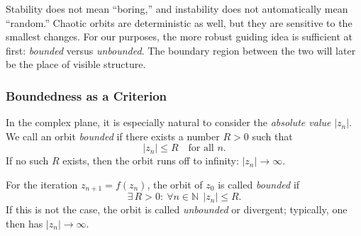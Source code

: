 \begin{figure}[h]
	\centering
	
	\hfill
\end{figure}

\begin{DidacticBox}
	\label{box:stable}
	Stability does not mean ``boring,''
	and instability does not automatically mean ``random.''
	Chaotic orbits are deterministic as well,
	but they are sensitive to the smallest changes.
	For our purposes, the more robust guiding idea is sufficient at first:
	\emph{bounded} versus \emph{unbounded}.
	The boundary region between the two will later be the place of visible structure.
\end{DidacticBox}

\subsubsection*{Boundedness as a Criterion}

In the complex plane, it is especially natural to consider the \emph{absolute value} $|z_n|$.
We call an orbit \emph{bounded} if there exists a number $R>0$ such that
\[
|z_n|\le R \quad \text{for all } n.
\]
If no such $R$ exists, then the orbit runs off to infinity:
$|z_n|\to\infty$.

\begin{MathBox}
	\label{box:bounded}
	For the iteration $z_{n+1}=f(z_n)$, the orbit of $z_0$ is called \emph{bounded} if
	\[
	\exists\, R>0:\ \forall n\in\mathbb{N}\ \ |z_n|\le R.
	\]
	If this is not the case, the orbit is called \emph{unbounded} or divergent;
	typically, one then has $|z_n|\to\infty$.
\end{MathBox}

